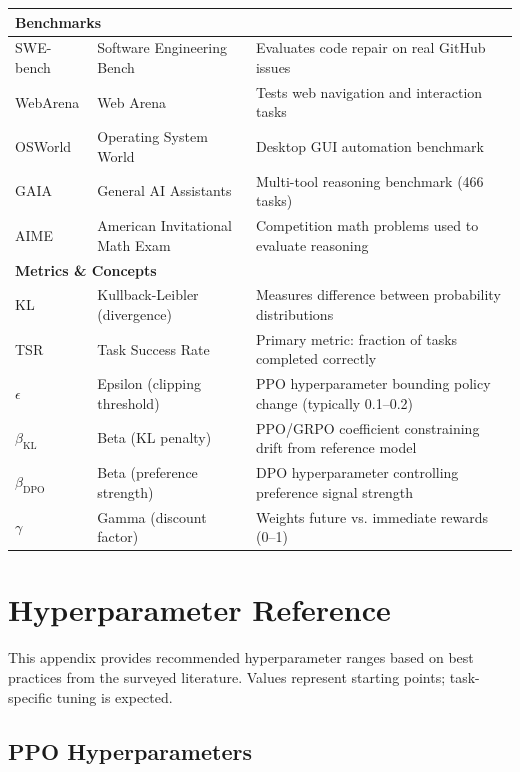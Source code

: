 \documentclass[12pt,a4paper]{report}
\theoremstyle{definition}
\begin{document}
\begin{longtable}{@{}p{2.5cm}p{5cm}p{7cm}@{}}
\multicolumn{3}{l}{\textbf{Benchmarks}} \\
\midrule
SWE-bench & Software Engineering Bench & Evaluates code repair on real GitHub issues \\
WebArena & Web Arena & Tests web navigation and interaction tasks \\
OSWorld & Operating System World & Desktop GUI automation benchmark \\
GAIA & General AI Assistants & Multi-tool reasoning benchmark (466 tasks) \\
AIME & American Invitational Math Exam & Competition math problems used to evaluate reasoning \\
\midrule

\multicolumn{3}{l}{\textbf{Metrics \& Concepts}} \\
\midrule
KL & Kullback-Leibler (divergence) & Measures difference between probability distributions \\
TSR & Task Success Rate & Primary metric: fraction of tasks completed correctly \\
$\epsilon$ & Epsilon (clipping threshold) & PPO hyperparameter bounding policy change (typically 0.1--0.2) \\
$\beta_{\text{KL}}$ & Beta (KL penalty) & PPO/GRPO coefficient constraining drift from reference model \\
$\beta_{\text{DPO}}$ & Beta (preference strength) & DPO hyperparameter controlling preference signal strength \\
$\gamma$ & Gamma (discount factor) & Weights future vs. immediate rewards (0--1) \\
\end{longtable}

\chapter{Hyperparameter Reference}
\label{app:hyperparams}

This appendix provides recommended hyperparameter ranges based on best practices from the surveyed literature. Values represent starting points; task-specific tuning is expected.

\section{PPO Hyperparameters}
\end{document}
